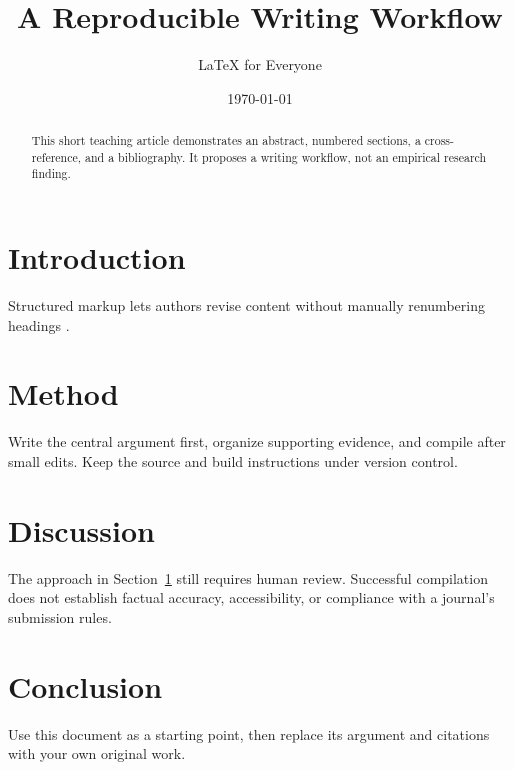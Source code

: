 \documentclass[11pt]{article}
\title{A Reproducible Writing Workflow}
\author{LaTeX for Everyone}
\date{\today}
\begin{document}
\maketitle
\begin{abstract}
This short teaching article demonstrates an abstract, numbered sections,
a cross-reference, and a bibliography. It proposes a writing workflow,
not an empirical research finding.
\end{abstract}

\section{Introduction}
\label{sec:intro}
Structured markup lets authors revise content without manually
renumbering headings \parencite{lamport1994}.

\section{Method}
Write the central argument first, organize supporting evidence, and
compile after small edits. Keep the source and build instructions
under version control.

\section{Discussion}
The approach in Section~\ref{sec:intro} still requires human review.
Successful compilation does not establish factual accuracy,
accessibility, or compliance with a journal's submission rules.

\section{Conclusion}
Use this document as a starting point, then replace its argument and
citations with your own original work.
\printbibliography
\end{document}
